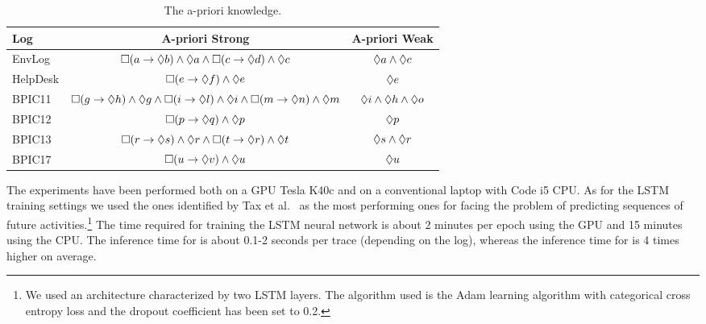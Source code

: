 \begin{table}[t!]
	\centering	
	\begin{scriptsize}
	\begin{tabular}{l|c|c}
		\toprule
		\textbf{Log}  & \textbf{A-priori Strong} & \textbf{A-priori Weak} \\
		\midrule
		EnvLog     & $\square(a \rightarrow \lozenge b) \wedge \lozenge a \wedge \square(c \rightarrow \lozenge d) \wedge \lozenge c$  & $\lozenge a \wedge \lozenge c$ \\
		HelpDesk   & $\square(e \rightarrow \lozenge f) \wedge \lozenge e$ & $\lozenge e$\\
		BPIC11      & $\square(g \rightarrow \lozenge h) \wedge \lozenge g \wedge \square(i \rightarrow \lozenge l) \wedge \lozenge i \wedge \square(m \rightarrow \lozenge n) \wedge \lozenge m$ &
		$\lozenge i \wedge \lozenge h \wedge \lozenge o$		\\
		BPIC12      & $\square(p \rightarrow \lozenge q) \wedge \lozenge p$ & $\lozenge p$   \\
		BPIC13      & $\square(r \rightarrow \lozenge s) \wedge \lozenge r \wedge \square(t \rightarrow \lozenge r) \wedge \lozenge t$ & $\lozenge s \wedge \lozenge r$ \\
		BPIC17      & $\square(u \rightarrow \lozenge v) \wedge \lozenge u$  & $\lozenge u$  \\
		\bottomrule
	\end{tabular}
	\end{scriptsize}
	\caption{The a-priori knowledge.}
	\label{table:apriori}
\end{table}
The experiments have been performed both on a GPU Tesla K40c and on a conventional laptop with Code i5 CPU. As for the LSTM training settings we used the ones identified by Tax et al.~\cite{niek96732} as the most performing ones for facing the problem of predicting sequences of future activities.\footnote{We used an architecture characterized by two LSTM layers. The algorithm used is the Adam learning algorithm with categorical cross entropy loss and the dropout coefficient has been set to 0.2.} The time required for training the LSTM neural network is about 2 minutes per epoch using the GPU and 15 minutes using the CPU. The inference time for \nocycle %
 is about 0.1-2 seconds per trace (depending on the log), whereas the inference time for \protrack is 4 times higher on average.



